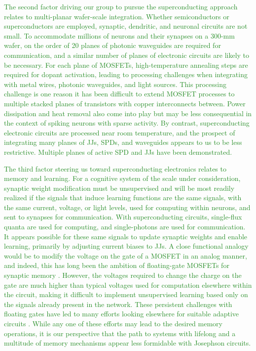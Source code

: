 \documentclass[twocolumn]{article}
\begin{document}
{\textcolor{ForestGreen}{The second factor driving our group to pursue the superconducting approach relates to multi-planar wafer-scale integration. Whether semiconductors or superconductors are employed, synaptic, dendritic, and neuronal circuits are not small. To accommodate millions of neurons and their synapses on a 300-mm wafer, on the order of 20 planes of photonic waveguides are required for communication, and a similar number of planes of electronic circuits are likely to be necessary. For each plane of MOSFETs, high-temperature annealing steps are required for dopant activation, leading to processing challenges when integrating with metal wires, photonic waveguides, and light sources. This processing challenge is one reason it has been difficult to extend MOSFET processes to multiple stacked planes of transistors with copper interconnects between. Power dissipation and heat removal also come into play but may be less consequential in the context of spiking neurons with sparse activity. By contrast, superconducting electronic circuits are processed near room temperature, and the prospect of integrating many planes of JJs, SPDs, and waveguides appears to us to be less restrictive. Multiple planes of active SPD \cite{vema2012} and JJs \cite{} have been demonstrated.}

\textcolor{ForestGreen}{The third factor steering us toward superconducting electronics relates to memory and learning. For a cognitive system of the scale under consideration, synaptic weight modification must be unsupervised and will be most readily realized if the signals that induce learning functions are the same signals, with the same current, voltage, or light levels, used for computing within neurons, and sent to synapses for communication. With superconducting circuits, single-flux quanta are used for computing, and single-photons are used for communication. It appears possible for these same signals to update synaptic weights and enable learning, primarily by adjusting current biases to JJs. A close functional analogy would be to modify the voltage on the gate of a MOSFET in an analog manner, and indeed, this has long been the ambition of floating-gate MOSFETs for synaptic memory \cite{hama2013}. However, the voltages required to change the charge on the gate are much higher than typical voltages used for computation elsewhere within the circuit, making it difficult to implement unsupervised learning based only on the signals already present in the network. These persistent challenges with floating gates have led to many efforts looking elsewhere for suitable adaptive circuits \cite{upji2019}. While any one of these efforts may lead to the desired memory operations, it is our perspective that the path to systems with lifelong and a multitude of memory mechanisms appear less formidable with Josephson circuits.}

}
\end{document}

